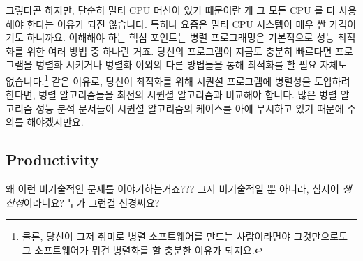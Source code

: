 그렇다곤 하지만, 단순히 멀티 CPU 머신이 있기 때문이란 게 그 모든 CPU 를 다
사용해야 한다는 이유가 되진 않습니다. 특히나 요즘은 멀티 CPU 시스템이 매우 싼
가격이기도 하니까요.
이해해야 하는 핵심 포인트는 병렬 프로그래밍은 기본적으로 성능 최적화를 위한
여러 방법 중 하나란 거죠.
당신의 프로그램이 지금도 충분히 빠르다면 프로그램을 병렬화 시키거나 병렬화
이외의 다른 방법들을 통해 최적화를 할 필요 자체도 없습니다.\footnote{
	물론, 당신이 그저 취미로 병렬 소프트웨어를 만드는 사람이라면야
	그것만으로도 그 소프트웨어가 뭐건 병렬화를 할 충분한 이유가 되지요.}
같은 이유로, 당신이 최적화를 위해 시퀀셜 프로그램에 병렬성을 도입하려 한다면,
병렬 알고리즘들을 최선의 시퀀셜 알고리즘과 비교해야 합니다.
많은 병렬 알고리즘 성능 분석 문서들이 시퀀셜 알고리즘의 케이스를 아예
무시하고 있기 때문에 주의를 해야겠지만요.

\subsection{Productivity}
\label{sec:intro:Productivity}

\QuickQuiz{}
	왜 이런 비기술적인 문제를 이야기하는거죠???
	그저 비기술적일 뿐 아니라, 심지어 \emph{생산성}이라니요?
	누가 그런걸 신경써요?

